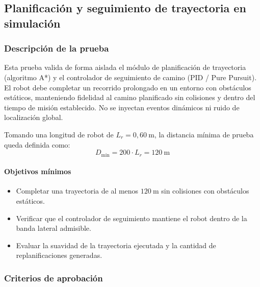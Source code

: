 \subsection{Planificación y seguimiento de trayectoria en simulación}

\subsubsection{Descripción de la prueba}

Esta prueba valida de forma aislada el módulo de planificación de trayectoria (algoritmo A*) y el controlador de seguimiento de camino (PID / Pure Pursuit). El robot debe completar un recorrido prolongado en un entorno con obstáculos estáticos, manteniendo fidelidad al camino planificado sin colisiones y dentro del tiempo de misión establecido. No se inyectan eventos dinámicos ni ruido de localización global.

Tomando una longitud de robot de $L_r = 0{,}60\ \text{m}$, la distancia mínima de prueba queda definida como:
\[
D_{\min} = 200 \cdot L_r = 120\ \text{m}
\]

\paragraph{Objetivos mínimos}
\begin{itemize}
    \item Completar una trayectoria de al menos $120\ \text{m}$ sin colisiones con obstáculos estáticos.
    \item Verificar que el controlador de seguimiento mantiene el robot dentro de la banda lateral admisible.
    \item Evaluar la suavidad de la trayectoria ejecutada y la cantidad de replanificaciones generadas.
\end{itemize}

\subsubsection{Criterios de aprobación}


